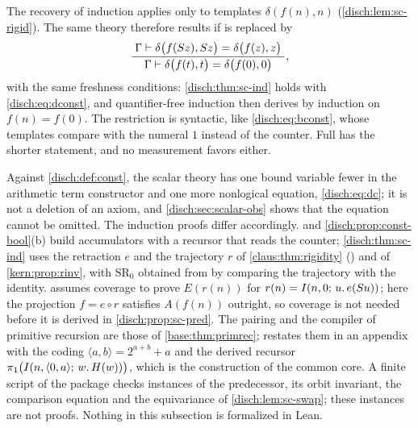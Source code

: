 \begin{remark}
\label{disch:rem:sc-dconst}
The recovery of induction applies  only to templates
$\delta(f(n),n)$ (\cref{disch:lem:sc-rigid}). The same theory therefore
results if  is replaced by
\begin{equation}
 \dfrac{\;\Gamma\vdash\delta\bigl(f(S z),S z\bigr)=\delta\bigl(f(z),z\bigr)\;}{\;\Gamma\vdash\delta\bigl(f(t),t\bigr)=\delta\bigl(f(0),0\bigr)\;},
 \label{disch:eq:dconst}
\end{equation}
with the same freshness conditions: \cref{disch:thm:sc-ind} holds with
\eqref{disch:eq:dconst}, and quantifier-free induction then derives
 by induction on $f(n)=f(0)$. The restriction is syntactic,
like  \eqref{disch:eq:bconst}, whose templates compare with
the numeral $1$ instead of the counter. Full  has the
shorter statement, and no measurement favors either.
\end{remark}

\begin{remark}
\label{disch:rem:sc}
Against \cref{disch:def:const}, the scalar theory has one bound variable
fewer in the arithmetic term constructor and one more nonlogical equation,
\eqref{disch:eq:dc}; it is not a deletion of an axiom, and
\cref{disch:sec:scalar-obs} shows that the equation cannot be omitted. The
induction proofs differ accordingly.  and
\cref{disch:prop:const-bool}(b) build accumulators with a recursor that
reads the counter; \cref{disch:thm:sc-ind} uses the retraction $e$ and the
trajectory $r$ of \cref{claus:thm:rigidity} () and of
\cref{kern:prop:rinv}, with $\mathrm{SR}_0$ obtained from 
by comparing the trajectory with the identity. 
assumes coverage to prove $E(r(n))$ for $r(n)=I(n,0;\,u.\,e(S u))$; here
the projection $f=e\circ r$ satisfies $A(f(n))$ outright, so coverage is not
needed before it is derived in \cref{disch:prop:sc-pred}. The pairing and
the compiler of primitive recursion are those of
\cref{base:thm:primrec};  restates them in an
appendix with the coding $\langle a,b\rangle=2^{a+b}+a$ and the derived
recursor $\pi_1\bigl(I(n,\langle 0,a\rangle;\,w.\,H(w))\bigr)$, which is the
construction of the common core. A finite script of the package checks
instances of the predecessor, its orbit invariant, the comparison equation
and the equivariance of \cref{disch:lem:sc-swap}; these instances are not
proofs. Nothing in this subsection is formalized in Lean.
\end{remark}

